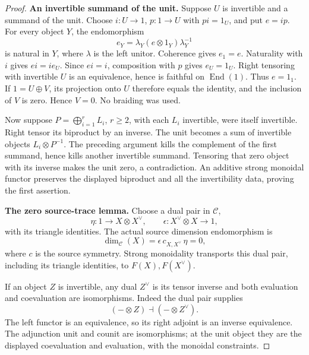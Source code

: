 \begin{proof}
\par\smallskip\noindent\textbf{An invertible summand of the unit.}\quad
Suppose \(U\) is invertible and a summand of the unit.
Choose \(i:U\to1\), \(p:1\to U\) with \(pi=1_U\),
and put \(e=ip\).
For every object \(Y\), the endomorphism
\[
 e_Y=\lambda_Y(e\otimes1_Y)\lambda_Y^{-1}
\]
is natural in \(Y\), where \(\lambda\) is the
left unitor. Coherence gives \(e_1=e\).
Naturality with \(i\) gives \(ei=i e_U\).
Since \(ei=i\), composition with \(p\) gives
\(e_U=1_U\).
Right tensoring with invertible \(U\) is an
equivalence, hence is faithful on
\(\operatorname{End}(1)\). Thus \(e=1_1\).
If \(1=U\oplus V\), its projection onto \(U\)
therefore equals the identity, and the inclusion
of \(V\) is zero. Hence \(V=0\).
No braiding was used.

Now suppose \(P=\bigoplus_{i=1}^rL_i\), \(r\ge2\),
with each \(L_i\) invertible, were itself invertible.
Right tensor its biproduct by an inverse.
The unit becomes a sum of invertible objects
\(L_i\otimes P^{-1}\).
The preceding argument kills the complement of
the first summand, hence kills another invertible
summand. Tensoring that zero object with its inverse
makes the unit zero, a contradiction.
An additive strong monoidal functor preserves
the displayed biproduct and all the invertibility
data, proving the first assertion.

\par\smallskip\noindent\textbf{The zero source-trace lemma.}\quad
Choose a dual pair in \(\mathcal C\),
\[
 \eta:1\to X\otimes X^\vee,\qquad
 \epsilon:X^\vee\otimes X\to1,
\]
with its triangle identities. The actual
source dimension endomorphism is
\begin{equation}\label{eq:sourceZeroTraceWord}
 \dim_{\mathcal C}(X)
       =\epsilon\,c_{X,X^\vee}\,\eta=0,
\end{equation}
where \(c\) is the source symmetry.
Strong monoidality transports this dual pair,
including its triangle identities, to
\(F(X),F(X^\vee)\).

If an object \(Z\) is invertible, any dual
\(Z^\vee\) is its tensor inverse and both
evaluation and coevaluation are isomorphisms.
Indeed the dual pair supplies
\[
 (-\otimes Z)\dashv(-\otimes Z^\vee).
\]
The left functor is an equivalence, so its right
adjoint is an inverse equivalence. The adjunction
unit and counit are isomorphisms; at the unit
object they are the displayed coevaluation and
evaluation, with the monoidal constraints.


\end{proof}
